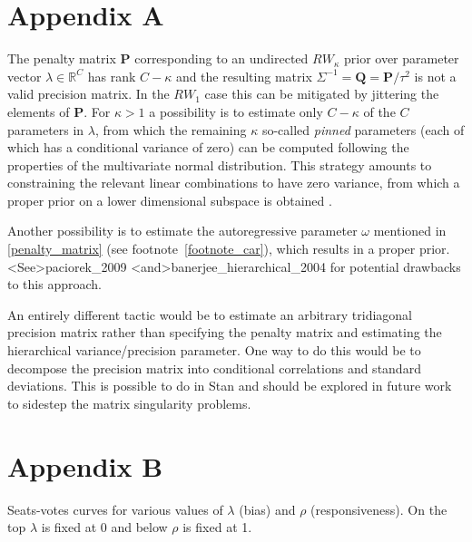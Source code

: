 

\chapter[Improper priors]{Appendix A} \label{AppendixA}

The penalty matrix $\mathbf{P}$ corresponding to an undirected $RW_\kappa$ prior over parameter vector $\lambda \in \mathbb{R}^C$ has rank $C - \kappa$ and the resulting matrix $\Sigma^{-1} = \mathbf{Q} = \mathbf{P}/\tau^2$ is not a valid precision matrix. In the $RW_1$ case this can be mitigated by jittering the elements of $\mathbf{P}$. For $\kappa > 1$ a possibility is to estimate only $C - \kappa$ of the $C$ parameters in $\lambda$,  from which the remaining $\kappa$ so-called {\it pinned} parameters (each of which has a conditional variance of zero) can be computed following the properties of the multivariate normal distribution. This strategy amounts to  constraining the relevant linear combinations to have zero variance, from which a proper prior on a lower dimensional subspace is obtained . 

Another possibility is to estimate the autoregressive parameter $\omega$ mentioned in \ref{penalty_matrix} (see footnote~\ref{footnote_car}), which results in a proper prior. \citeA<See>{paciorek_2009} \citeA<and>{banerjee_hierarchical_2004} for potential drawbacks to this approach.

An entirely different tactic would be to estimate an arbitrary tridiagonal precision matrix rather than specifying the penalty matrix and estimating the hierarchical variance/precision parameter. One way to do this would be to decompose the precision matrix into conditional correlations and standard deviations. This is possible to do in Stan and should be explored in future work to sidestep the matrix singularity problems. 


\clearpage
\chapter[Seats-votes curves]{Appendix B}\label{AppendixB}

Seats-votes curves for various values of $\lambda$ (bias) and $\rho$ (responsiveness). On the top $\lambda$ is fixed at 0 and below $\rho$ is fixed at 1.


